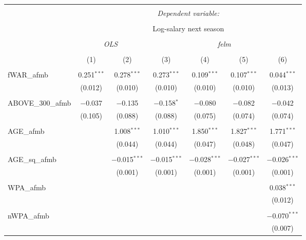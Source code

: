 
\begin{table}[!htbp] \centering
  \caption{}
  \label{}
  \scriptsize
\begin{tabular}{@{\extracolsep{5pt}}lcccccc}
\\[-1.8ex]\hline
\hline \\[-1.8ex]
 & \multicolumn{6}{c}{\textit{Dependent variable:}} \\
\cline{2-7}
\\[-1.8ex] & \multicolumn{6}{c}{Log-salary next season} \\ 
\\[-1.8ex] & \multicolumn{2}{c}{\textit{OLS}} & \multicolumn{4}{c}{\textit{felm}} \\
\\[-1.8ex] & (1) & (2) & (3) & (4) & (5) & (6)\\
\hline \\[-1.8ex]
 fWAR\_afmb & 0.251$^{***}$ & 0.278$^{***}$ & 0.273$^{***}$ & 0.109$^{***}$ & 0.107$^{***}$ & 0.044$^{***}$ \\
  & (0.012) & (0.010) & (0.010) & (0.010) & (0.010) & (0.013) \\
  & & & & & & \\
 ABOVE\_300\_afmb & $-$0.037 & $-$0.135 & $-$0.158$^{*}$ & $-$0.080 & $-$0.082 & $-$0.042 \\
  & (0.105) & (0.088) & (0.088) & (0.075) & (0.074) & (0.074) \\
  & & & & & & \\
 AGE\_afmb &  & 1.008$^{***}$ & 1.010$^{***}$ & 1.850$^{***}$ & 1.827$^{***}$ & 1.771$^{***}$ \\
  &  & (0.044) & (0.044) & (0.047) & (0.048) & (0.047) \\
  & & & & & & \\
 AGE\_sq\_afmb &  & $-$0.015$^{***}$ & $-$0.015$^{***}$ & $-$0.028$^{***}$ & $-$0.027$^{***}$ & $-$0.026$^{***}$ \\
  &  & (0.001) & (0.001) & (0.001) & (0.001) & (0.001) \\
  & & & & & & \\
 WPA\_afmb &  &  &  &  &  & 0.038$^{***}$ \\
  &  &  &  &  &  & (0.012) \\
  & & & & & & \\
 nWPA\_afmb &  &  &  &  &  & $-$0.070$^{***}$ \\
  &  &  &  &  &  & (0.007) \\

\end{tabular}
\end{table}
